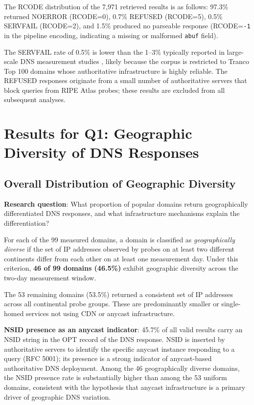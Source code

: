 The RCODE distribution of the 7,971 retrieved results is as follows: 97.3\% returned NOERROR (RCODE=0), 0.7\% REFUSED (RCODE=5), 0.5\% SERVFAIL (RCODE=2), and 1.5\% produced no parseable response (RCODE=\texttt{-1} in the pipeline encoding, indicating a missing or malformed \texttt{abuf} field).

The SERVFAIL rate of 0.5\% is lower than the 1--3\% typically reported in large-scale DNS measurement studies \cite{vanRijswijk2016}, likely because the corpus is restricted to Tranco Top 100 domains whose authoritative infrastructure is highly reliable. The REFUSED responses originate from a small number of authoritative servers that block queries from RIPE Atlas probes; these results are excluded from all subsequent analyses.

\bigskip
\section{Results for Q1: Geographic Diversity of DNS Responses}
\label{sec:4.2}

\subsection{Overall Distribution of Geographic Diversity}
\label{subsec:4.2.1}

\textbf{Research question}: What proportion of popular domains return geographically differentiated DNS responses, and what infrastructure mechanisms explain the differentiation?

For each of the 99 measured domains, a domain is classified as \emph{geographically diverse} if the set of IP addresses observed by probes on at least two different continents differ from each other on at least one measurement day. Under this criterion, \textbf{46 of 99 domains (46.5\%)} exhibit geographic diversity across the two-day measurement window.

The 53 remaining domains (53.5\%) returned a consistent set of IP addresses across all continental probe groups. These are predominantly smaller or single-homed services not using CDN or anycast infrastructure.

\textbf{NSID presence as an anycast indicator}: 45.7\% of all valid results carry an NSID string in the OPT record of the DNS response. NSID is inserted by authoritative servers to identify the specific anycast instance responding to a query (RFC 5001); its presence is a strong indicator of anycast-based authoritative DNS deployment. Among the 46 geographically diverse domains, the NSID presence rate is substantially higher than among the 53 uniform domains, consistent with the hypothesis that anycast infrastructure is a primary driver of geographic DNS variation.


